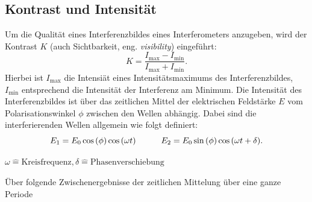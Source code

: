 \FloatBarrier
\subsection{Kontrast und Intensität}
Um die Qualität eines Interferenzbildes eines Interferometers anzugeben, wird der Kontrast $K$ (auch Sichtbarkeit, eng. \textit{visibility}) eingeführt:
\begin{equation}
	K = \frac{I_{\text{max}} - I_{\text{min}}} {I_{\text{max}} + I_{\text{min}}}.
	\label{eqn:kontrastohnewinkel}
\end{equation}
Hierbei ist $I_{\text{max}}$ die Intensiät eines Intensitätsmaximums des Interferenzbildes, $I_{\text{min}}$ entsprechend die Intensität der Interferenz am Minimum.
Die Intensität des Interferenzbildes ist über das zeitlichen Mittel der elektrischen Feldstärke $E$ vom Polarisationswinkel $\phi$ zwischen den Wellen abhängig.
Dabei sind die interferierenden Wellen allgemein wie folgt definiert:
\begin{equation*}
	E_{1} =  E_{0} \cos{\left( \phi \right)} \cos{ \left( \omega t \right) } 			\quad \quad \quad
	E_{2} =  E_{0} \sin{\left( \phi \right)} \cos{ \left( \omega t + \delta \right) }. 	\\
\end{equation*}
\begin{center}
	\tiny{$\omega \widehat{=} \text{Kreisfrequenz}, \delta \widehat{=} \text{Phasenverschiebung} $}
\end{center}
Über folgende Zwischenergebnisse der zeitlichen Mittelung über eine ganze Periode
